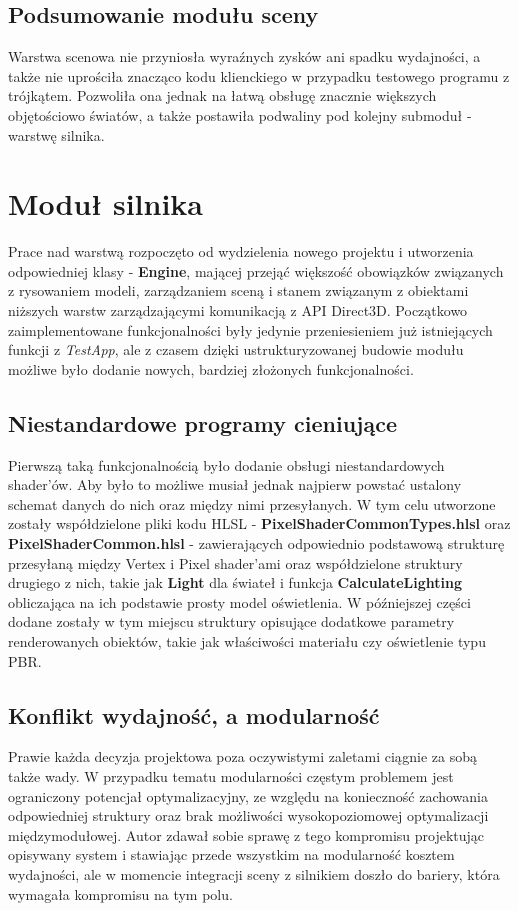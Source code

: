 \subsection{Podsumowanie modułu sceny}
Warstwa scenowa nie przyniosła wyraźnych zysków ani spadku wydajności, a także nie uprościła znacząco kodu klienckiego w przypadku testowego programu z trójkątem. Pozwoliła ona jednak na łatwą obsługę znacznie większych objętościowo światów, a także postawiła podwaliny pod kolejny submoduł - warstwę silnika.

\section{Moduł silnika}
Prace nad warstwą rozpoczęto od wydzielenia nowego projektu i utworzenia odpowiedniej klasy - \textbf{Engine}, mającej przejąć większość obowiązków związanych z rysowaniem modeli, zarządzaniem sceną i stanem związanym z obiektami niższych warstw zarządzającymi komunikacją z API Direct3D. Początkowo zaimplementowane funkcjonalności były jedynie przeniesieniem już istniejących funkcji z \textit{TestApp}, ale z czasem dzięki ustrukturyzowanej budowie modułu możliwe było dodanie nowych, bardziej złożonych funkcjonalności. 

\subsection{Niestandardowe programy cieniujące}
Pierwszą taką funkcjonalnością było dodanie obsługi niestandardowych shader'ów. Aby było to możliwe musiał jednak najpierw powstać ustalony schemat danych do nich oraz między nimi przesyłanych. W tym celu utworzone zostały współdzielone pliki kodu HLSL - \textbf{PixelShaderCommonTypes.hlsl} oraz \textbf{PixelShaderCommon.hlsl} - zawierających odpowiednio podstawową strukturę przesyłaną między Vertex i Pixel shader'ami oraz współdzielone struktury drugiego z nich, takie jak \textbf{Light} dla świateł i funkcja \textbf{CalculateLighting} obliczająca na ich podstawie prosty model oświetlenia. W późniejszej części dodane zostały w tym miejscu struktury opisujące dodatkowe parametry renderowanych obiektów, takie jak właściwości materiału czy oświetlenie typu PBR.

\subsection{Konflikt wydajność, a modularność}
Prawie każda decyzja projektowa poza oczywistymi zaletami ciągnie za sobą także wady. W przypadku tematu modularności częstym problemem jest ograniczony potencjał optymalizacyjny, ze względu na konieczność zachowania odpowiedniej struktury oraz brak możliwości wysokopoziomowej optymalizacji międzymodułowej. Autor zdawał sobie sprawę z tego kompromisu projektując opisywany system i stawiając przede wszystkim na modularność kosztem wydajności, ale w momencie integracji sceny z silnikiem doszło do bariery, która wymagała kompromisu na tym polu. 

